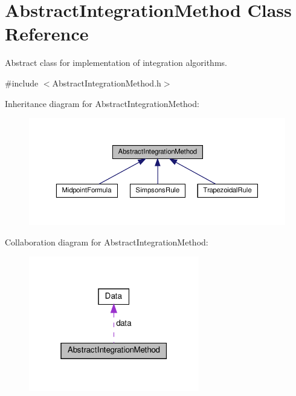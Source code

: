 \hypertarget{class_abstract_integration_method}{}\section{Abstract\+Integration\+Method Class Reference}
\label{class_abstract_integration_method}


Abstract class for implementation of integration algorithms.  




{\ttfamily \#include $<$Abstract\+Integration\+Method.\+h$>$}



Inheritance diagram for Abstract\+Integration\+Method\+:\nopagebreak
\begin{figure}[H]
\begin{center}
\leavevmode
\includegraphics[width=350pt]{class_abstract_integration_method__inherit__graph}
\end{center}
\end{figure}


Collaboration diagram for Abstract\+Integration\+Method\+:\nopagebreak
\begin{figure}[H]
\begin{center}
\leavevmode
\includegraphics[width=211pt]{class_abstract_integration_method__coll__graph}
\end{center}
\end{figure}
